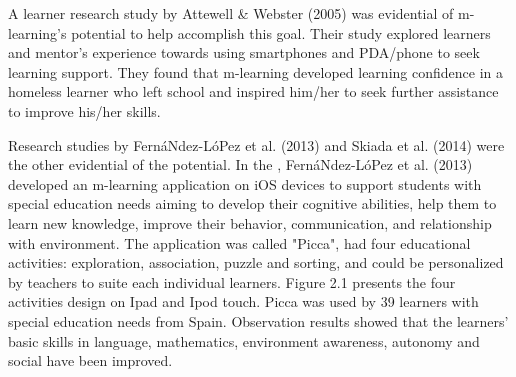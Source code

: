 A learner research study by Attewell \& Webster (2005) \cite{attewell2005engaging} was evidential of m-learning's potential to help accomplish this goal. Their study explored learners and mentor's experience towards using smartphones and PDA/phone to seek learning support. They found that m-learning developed learning confidence in a homeless learner who left school and inspired him/her to seek further assistance to improve his/her skills.

Research studies by Fern{\'a}Ndez-L{\'o}Pez et al. (2013) \cite{fernandez2013mobile} and Skiada et al. (2014) \cite{skiada2014easylexia} were the other evidential of the potential. In the \cite{fernandez2013mobile}, Fern{\'a}Ndez-L{\'o}Pez et al. (2013) developed an m-learning application on iOS devices to support students with special education needs aiming to develop their cognitive abilities, help them to learn new knowledge, improve their behavior, communication, and relationship with environment. The application was called "Picca", had four educational activities: exploration, association, puzzle and sorting, and could be personalized by teachers to suite each individual learners. Figure 2.1 presents the four activities design on Ipad and Ipod touch. Picca was used by 39 learners with special education needs from Spain. Observation results showed that the learners' basic skills in language, mathematics, environment awareness, autonomy and social have been improved. 

